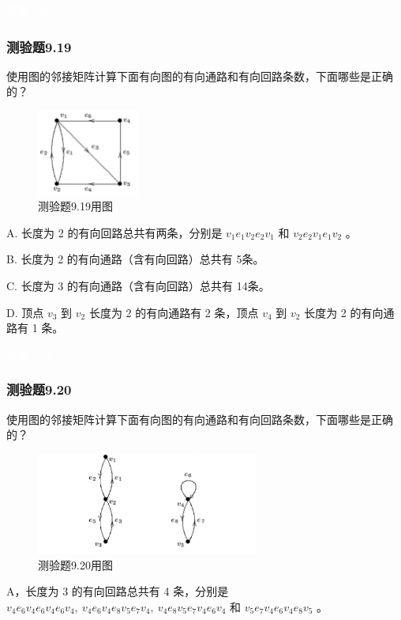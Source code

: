 \documentclass[UTF8, heading=true]{ctexart}
\begin{document}
\textcolor{white}{答案：BC}

\subsubsection{测验题9.19}

使用图的邻接矩阵计算下面有向图的有向通路和有向回路条数，下面哪些是正确的？

\begin{figure}[H]
  \centering
  \includegraphics[width=0.3\textwidth]{9.19.jpg} %
  \caption{测验题9.19用图}
\end{figure}

A. 长度为 2 的有向回路总共有两条，分别是 $v_1 e_1 v_2 e_2 v_1$ 和 $v_2 e_2 v_1 e_1 v_2$ 。

B. 长度为 2 的有向通路（含有向回路）总共有 5条。

C. 长度为 3 的有向通路（含有向回路）总共有 14条。

D.  顶点 $v_3$ 到 $v_2$ 长度为 2 的有向通路有 2 条，顶点 $v_4$ 到 $v_2$ 长度为 2 的有向通路有 1 条。

\textcolor{white}{答案：AC}

\subsubsection{测验题9.20}

使用图的邻接矩阵计算下面有向图的有向通路和有向回路条数，下面哪些是正确的？

\begin{figure}[H]
  \centering
  \includegraphics[width=0.65\textwidth]{9.20.jpg} %
  \caption{测验题9.20用图}
\end{figure}


A，长度为 3 的有向回路总共有 4 条，分别是 $v_4 e_6 v_4 e_6 v_4 e_6 v_4, ~ v_4 e_6 v_4 e_8 v_5 e_7 v_4, ~ v_4 e_8 v_5 e_7 v_4 e_6 v_4$ 和 $v_5 e_7 v_4 e_6 v_4 e_8 v_5$ 。
\end{document}
